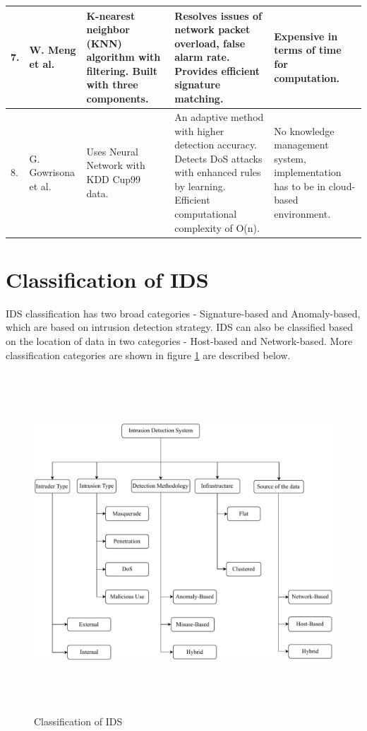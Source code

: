\begin{longtable}[c]{|p{0.25in}|p{0.75in}|p{1.5in}|p{1.5in}|p{1.5in}|}
7. & W. Meng et al. \cite{meng2014efm} & K-nearest neighbor (KNN) algorithm with filtering. Built with three components. & Resolves issues of network packet overload, false alarm rate. Provides efficient signature matching. & Expensive in terms of time for computation. \\ \hline
8. & G. Gowrisona et al. \cite{gowrison2013minimal} & Uses Neural Network with KDD Cup99 data. & An adaptive method with higher detection accuracy. Detects DoS attacks with enhanced rules by learning. Efficient computational complexity of O(n). & No knowledge management system, implementation has to be in cloud-based environment. \\ \hline
\end{longtable}

\section{Classification of IDS}
IDS classification has two broad categories - Signature-based and Anomaly-based, which are based on intrusion detection strategy. IDS can also be classified based on the location of data in two categories - Host-based and Network-based. More classification categories are shown in figure \ref{IDS-Classification} \cite{alrajeh2013intrusion, farooqi2009intrusion} are described below.

\begin{figure}[ht]
\center	
\includegraphics[width=\textwidth, height=5in] {Figures/PDF/IDS_Classification.pdf}
\caption{Classification of IDS}
\label{IDS-Classification}	
\end{figure}

